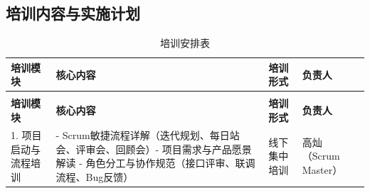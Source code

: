 \newpage

\subsection{培训内容与实施计划}

\begin{longtable}{>{\centering\arraybackslash}m{2.5cm} >{\centering\arraybackslash}m{6cm} >{\centering\arraybackslash}m{2.5cm} >{\centering\arraybackslash}m{2.5cm}}

    \caption{培训安排表} \label{tab:training}                                                                                                                                                                 \\

    \toprule
    \textbf{培训模块}                                                                                                                                         & \textbf{核心内容} & \textbf{培训形式} & \textbf{负责人} \\
    \midrule
    \endfirsthead

    \multicolumn{4}{c}{{\tablename\ \thetable{} 续表}}                                                                                                                                                     \\
    \toprule
    \textbf{培训模块}                                                                                                                                         & \textbf{核心内容} & \textbf{培训形式} & \textbf{负责人} \\
    \midrule
    \endhead

    \bottomrule
    \endfoot

    1. 项目启动与流程培训                                                                                                                                          &
    - Scrum敏捷流程详解（迭代规划、每日站会、评审会、回顾会）\newline - 项目需求与产品愿景解读 \newline - 角色分工与协作规范（接口评审、联调流程、Bug反馈）                                                          &
    线下集中培训                                                                                                                                                &
    高灿（Scrum Master）                                                                                                                                                                                     \\



\end{longtable}
